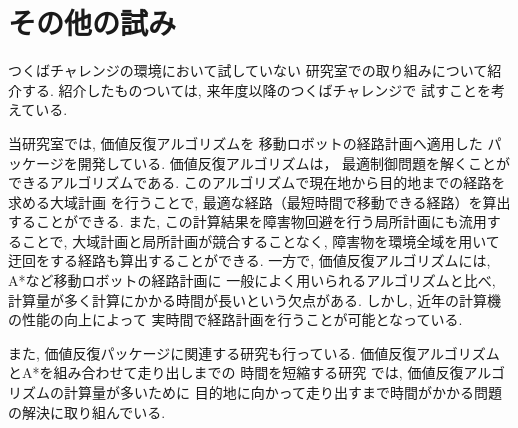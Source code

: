 \documentclass[twocolumn,9pt]{jsproceedings}
\begin{document}
\section{その他の試み}

つくばチャレンジの環境において試していない
研究室での取り組みについて紹介する. 
紹介したものついては, 来年度以降のつくばチャレンジで
試すことを考えている. 

当研究室では, 価値反復アルゴリズムを
移動ロボットの経路計画へ適用した
パッケージを開発している\cite{ueda2023JRM}. 
価値反復アルゴリズムは，
最適制御問題を解くことができるアルゴリズムである. \cite{上田詳解}
このアルゴリズムで現在地から目的地までの経路を求める大域計画
を行うことで, 最適な経路（最短時間で移動できる経路）を算出することができる. 
また, この計算結果を障害物回避を行う局所計画にも流用することで, 
大域計画と局所計画が競合することなく, 
障害物を環境全域を用いて迂回をする経路も算出することができる. 
一方で, 価値反復アルゴリズムには, A*など移動ロボットの経路計画に
一般によく用いられるアルゴリズムと比べ, 
計算量が多く計算にかかる時間が長いという欠点がある. 
しかし, 近年の計算機の性能の向上によって
実時間で経路計画を行うことが可能となっている. 

また, 価値反復パッケージに関連する研究も行っている. 
価値反復アルゴリズムとA*を組み合わせて走り出しまでの
時間を短縮する研究\cite{中村2024}
では, 価値反復アルゴリズムの計算量が多いために
目的地に向かって走り出すまで時間がかかる問題の解決に取り組んでいる. 






\end{document}
